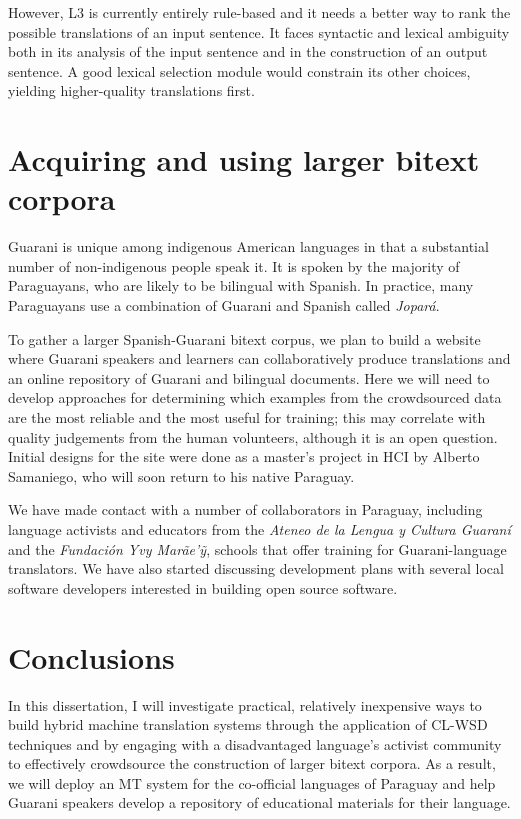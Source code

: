 \documentclass{article}
\begin{document}
However, L3 is currently entirely rule-based and it needs a better way to rank
the possible translations of an input sentence. It faces syntactic and lexical
ambiguity both in its analysis of the input sentence and in the construction of
an output sentence.  A good lexical selection module would constrain its other
choices, yielding higher-quality translations first.

\section{Acquiring and using larger bitext corpora}
Guarani is unique among indigenous American languages in that a substantial
number of non-indigenous people speak it. It is spoken by the majority of
Paraguayans, who are likely to be bilingual with Spanish. In practice, many
Paraguayans use a combination of Guarani and Spanish called \emph{Jopar{\'a}}.

To gather a larger Spanish-Guarani bitext corpus, we plan to build a website
where Guarani speakers and learners can collaboratively produce translations
and an online repository of Guarani and bilingual documents.  Here we will need
to develop approaches for determining which examples from the crowdsourced data
are the most reliable and the most useful for training; this may correlate
with quality judgements from the human volunteers, although it is an open
question. Initial designs for the site were done as a master's project in HCI
by Alberto Samaniego, who will soon return to his native Paraguay.

We have made contact with a number of collaborators in Paraguay, including
language activists and educators from the \emph{Ateneo de la Lengua y Cultura
Guaraní} and the \emph{Fundación Yvy Marãe'{\~y}}, schools that offer training
for Guarani-language translators. We have also started discussing development
plans with several local software developers interested in building open source
software.

\section{Conclusions}
In this dissertation, I will investigate practical, relatively inexpensive ways
to build hybrid machine translation systems through the application of CL-WSD
techniques and by engaging with a disadvantaged language's activist community
to effectively crowdsource the construction of larger bitext corpora. As a
result, we will deploy an MT system for the co-official languages of Paraguay
and help Guarani speakers develop a repository of educational materials for
their language.
\end{document}
